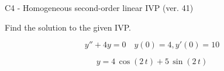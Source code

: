 \begin{exercise}
  \begin{exerciseTitle}C4 - Homogeneous second-order linear IVP (ver. 41)\end{exerciseTitle}
  \begin{exerciseStatement}
    
Find the solution to the given IVP.

    
\[y''+4y = 0 \hspace{1em} y(0) = 4 , y'(0) = 10\]

  \end{exerciseStatement}
  \begin{exerciseAnswer}
    
\[y= 4 \, \cos\left(2 \, t\right) + 5 \, \sin\left(2 \, t\right)\]

  \end{exerciseAnswer}
\end{exercise}